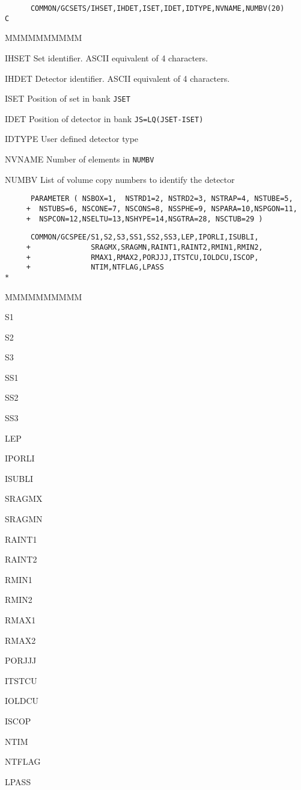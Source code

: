 \begin{verbatim}
      COMMON/GCSETS/IHSET,IHDET,ISET,IDET,IDTYPE,NVNAME,NUMBV(20)
C
\end{verbatim}
\begin{DLtt}{MMMMMMMMMM}
\item[IHSET]   Set identifier. ASCII equivalent of 4 characters.
\item[IHDET]   Detector identifier. ASCII equivalent of 4 characters.
\item[ISET]    Position of set in bank {\tt JSET}
\item[IDET]    Position of detector in bank {\tt JS=LQ(JSET-ISET)}
\item[IDTYPE]  User defined detector type
\item[NVNAME]  Number of elements in {\tt NUMBV}
\item[NUMBV]   List of volume copy numbers to identify the detector
\end{DLtt}
\begin{verbatim}
      PARAMETER ( NSBOX=1,  NSTRD1=2, NSTRD2=3, NSTRAP=4, NSTUBE=5,
     +  NSTUBS=6, NSCONE=7, NSCONS=8, NSSPHE=9, NSPARA=10,NSPGON=11,
     +  NSPCON=12,NSELTU=13,NSHYPE=14,NSGTRA=28, NSCTUB=29 )
\end{verbatim}
\begin{verbatim}
      COMMON/GCSPEE/S1,S2,S3,SS1,SS2,SS3,LEP,IPORLI,ISUBLI,
     +              SRAGMX,SRAGMN,RAINT1,RAINT2,RMIN1,RMIN2,
     +              RMAX1,RMAX2,PORJJJ,ITSTCU,IOLDCU,ISCOP,
     +              NTIM,NTFLAG,LPASS
*
\end{verbatim}
\begin{DLtt}{MMMMMMMMMM}
\item[S1]
\item[S2]
\item[S3]
\item[SS1]
\item[SS2]
\item[SS3]
\item[LEP]
\item[IPORLI]
\item[ISUBLI]
\item[SRAGMX]
\item[SRAGMN]
\item[RAINT1]
\item[RAINT2]
\item[RMIN1]
\item[RMIN2]
\item[RMAX1]
\item[RMAX2]
\item[PORJJJ]
\item[ITSTCU]
\item[IOLDCU]
\item[ISCOP]
\item[NTIM]
\item[NTFLAG]
\item[LPASS]
\end{DLtt}
